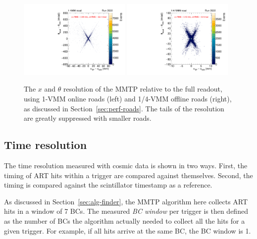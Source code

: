 \begin{figure}[!htpb]
  \begin{center}
    \includegraphics[width=0.48\textwidth]{figures/gbtanalysis3522/TP_xres_angres_full.pdf}
    \includegraphics[width=0.48\textwidth]{figures/gbtanalysis3522/TP_xres_angres.pdf}
  \end{center}
  \vspace{-10pt}
  \caption{The $x$ and $\theta$ resolution of the MMTP relative to the full readout, using 1-VMM online roads (left) and 1/4-VMM offline roads (right), as discussed in Section~\ref{sec:perf-roads}. The tails of the resolution are greatly suppressed with smaller roads.}
  \label{fig:xthetares}
\end{figure}

\subsection{Time resolution}

The time resolution measured with cosmic data is shown in two ways. First, the timing of ART hits within a trigger are compared against themselves. Second, the timing is compared against the scintillator timestamp as a reference.

As discussed in Section~\ref{sec:alg-finder}, the MMTP algorithm here collects ART hits in a window of 7 BCs. The measured \textit{BC window} per trigger is then defined as the number of BCs the algorithm actually needed to collect all the hits for a given trigger. For example, if all hits arrive at the same BC, the BC window is 1.

